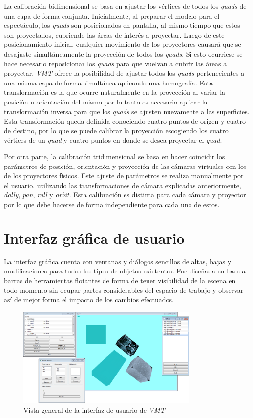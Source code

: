 La calibración bidimensional se basa en ajustar los vértices de todos los \emph{quads} de una capa de forma conjunta.
Inicialmente, al preparar el modelo para el espectáculo, los \emph{quads} son posicionados en pantalla, al mismo tiempo que estos son proyectados, cubriendo las áreas de interés a proyectar. Luego de este posicionamiento inicial, cualquier movimiento de los proyectores causará que se desajuste simultáneamente la proyección de todos los \emph{quads}. Si esto ocurriese se hace necesario reposicionar los \emph{quads} para que vuelvan a cubrir las áreas a proyectar.
\emph{VMT} ofrece la posibilidad de ajustar todos los \emph{quads} pertenecientes a una misma capa de forma simultánea aplicando una homografía. Esta transformación es la que ocurre naturalmente en la proyección al variar la posición u orientación del mismo por lo tanto es necesario aplicar la transformación inversa para que los \emph{quads} se ajusten nuevamente a las superficies. Esta transformación queda definida conociendo cuatro puntos de origen y cuatro de destino, por lo que se puede calibrar la proyección escogiendo los cuatro vértices de un \emph{quad} y cuatro puntos en donde se desea proyectar el \emph{quad}.

Por otra parte, la calibración tridimensional se basa en hacer coincidir los parámetros de posición, orientación y proyección de las cámaras virtuales con los de los proyectores físicos. Este ajuste de parámetros se realiza manualmente por el usuario, utilizando las transformaciones de cámara explicadas anteriormente, \emph{dolly}, \emph{pan}, \emph{roll} y \emph{orbit}. Esta calibración es distinta para cada cámara y proyector por lo que debe hacerse de forma independiente para cada uno de estos.

\section{Interfaz gráfica de usuario}

La interfaz gráfica cuenta con ventanas y diálogos sencillos de altas, bajas y modificaciones para todos los tipos de objetos existentes. Fue diseñada en base a barras de herramientas flotantes de forma de tener visibilidad de la escena en todo momento sin ocupar partes considerables del espacio de trabajo y observar así de mejor forma el impacto de los cambios efectuados.

\begin{figure}[H]
  \centering
    \includegraphics[width=0.8\textwidth]{./Cap5_vmt/vmt_todo.png}
  \caption{Vista general de la interfaz de usuario de \emph{VMT}}
  \label{fig:VMT-MainWindow}
\end{figure}

